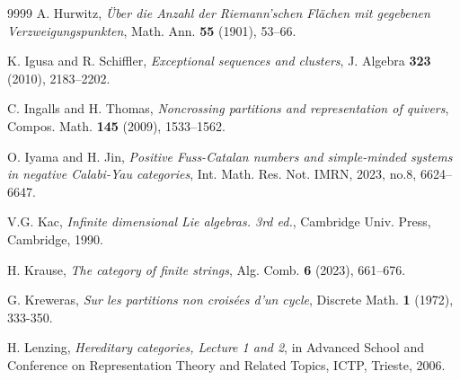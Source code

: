 \documentclass[a4paper, 11pt, reqno]{amsart}
\numberwithin{equation}{section}
\theoremstyle{remark}
\theoremstyle{definition}
\begin{document}
\begin{thebibliography}{9999}
    {\sc A. Hurwitz}, {\em {\"U}ber die {A}nzahl der {R}iemann'schen {F}l{\"a}chen mit gegebenen
   {V}erzweigungspunkten}, Math. Ann. {\bf 55} (1901), 53--66.


    {\sc K. Igusa and R. Schiffler}, {\em Exceptional sequences and clusters}, J. Algebra {\bf 323} (2010), 2183--2202.

    {\sc C. Ingalls and H. Thomas}, {\em Noncrossing partitions and representation of quivers}, Compos. Math. {\bf 145} (2009), 1533--1562.

    {\sc O. Iyama and H. Jin}, {\em Positive {F}uss-{C}atalan numbers and simple-minded systems in negative {C}alabi-{Y}au categories}, Int. Math. Res. Not. IMRN, 2023, no.8, 6624--6647.

    {\sc V.G. Kac}, {\em Infinite dimensional {L}ie algebras. 3rd ed.}, Cambridge Univ. Press, Cambridge, 1990.


    {\sc H. Krause}, {\em The category of finite strings}, Alg. Comb. {\bf 6} (2023), 661--676.



    {\sc G. Kreweras}, {\em Sur les partitions non crois{\'e}es d'un cycle}, Discrete Math. {\bf 1} (1972), 333-350.


    {\sc H. Lenzing}, {\em Hereditary categories, Lecture 1 and 2}, in Advanced School and Conference on Representation Theory and Related Topics, ICTP, Trieste, 2006.


\end{thebibliography}
\end{document}
